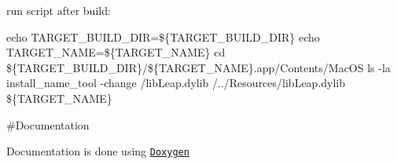 \begin{DoxyItemize}
\item run script after build\-:

echo T\-A\-R\-G\-E\-T\-\_\-\-B\-U\-I\-L\-D\-\_\-\-D\-I\-R=\$\{T\-A\-R\-G\-E\-T\-\_\-\-B\-U\-I\-L\-D\-\_\-\-D\-I\-R\} echo T\-A\-R\-G\-E\-T\-\_\-\-N\-A\-M\-E=\$\{T\-A\-R\-G\-E\-T\-\_\-\-N\-A\-M\-E\} cd \$\{T\-A\-R\-G\-E\-T\-\_\-\-B\-U\-I\-L\-D\-\_\-\-D\-I\-R\}/\$\{T\-A\-R\-G\-E\-T\-\_\-\-N\-A\-M\-E\}.app/\-Contents/\-Mac\-O\-S ls -\/la install\-\_\-name\-\_\-tool -\/change /lib\-Leap.dylib /../\-Resources/lib\-Leap.dylib \$\{T\-A\-R\-G\-E\-T\-\_\-\-N\-A\-M\-E\}
\end{DoxyItemize}

\#\-Documentation

Documentation is done using \href{doxygen.org}{\tt Doxygen} 